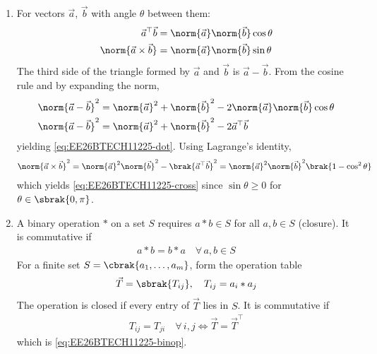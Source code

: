 \begin{enumerate}[label=\thesubsection.\arabic*, ref=\thesubsection.\theenumi]
\item For vectors $\vec{a}$, $\vec{b}$ with angle $\theta$ between them:
\begin{align}
	\vec{a}^{\top}\vec{b} &= \norm{\vec{a}}\norm{\vec{b}}\cos\theta
	\label{eq:EE26BTECH11225-dot}
	\\
	\norm{\vec{a} \times \vec{b}} &= \norm{\vec{a}}\norm{\vec{b}}\sin\theta
	\label{eq:EE26BTECH11225-cross}
\end{align}
\solution
The third side of the triangle formed by $\vec{a}$ and $\vec{b}$ is $\vec{a} - \vec{b}$. From the cosine rule and by expanding the norm,
\begin{align}
	\norm{\vec{a} - \vec{b}}^2 &= \norm{\vec{a}}^2 + \norm{\vec{b}}^2 - 2\norm{\vec{a}}\norm{\vec{b}}\cos\theta
	\\
	\norm{\vec{a} - \vec{b}}^2 &= \norm{\vec{a}}^2 + \norm{\vec{b}}^2 - 2\vec{a}^{\top}\vec{b}
\end{align}
yielding \eqref{eq:EE26BTECH11225-dot}. Using Lagrange's identity,
\begin{align}
	\norm{\vec{a} \times \vec{b}}^2 = \norm{\vec{a}}^2\norm{\vec{b}}^2 - \brak{\vec{a}^{\top}\vec{b}}^2
	= \norm{\vec{a}}^2\norm{\vec{b}}^2\brak{1 - \cos^2\theta}
\end{align}
which yields \eqref{eq:EE26BTECH11225-cross} since $\sin\theta \geq 0$ for $\theta \in \sbrak{0, \pi}$.

\item A binary operation $*$ on a set $S$ requires $a * b \in S$ for all $a, b \in S$ (closure). It is commutative if
\begin{align}
	a * b = b * a \quad \forall\, a, b \in S
	\label{eq:EE26BTECH11225-binop}
\end{align}
\solution
For a finite set $S = \cbrak{a_1, \ldots, a_m}$, form the operation table
\begin{align}
	\vec{T} = \sbrak{T_{ij}}, \quad T_{ij} = a_i * a_j
\end{align}
The operation is closed if every entry of $\vec{T}$ lies in $S$. It is commutative if
\begin{align}
	T_{ij} = T_{ji} \quad \forall\, i, j
	\iff \vec{T} = \vec{T}^{\top}
\end{align}
which is \eqref{eq:EE26BTECH11225-binop}.


\end{enumerate}
